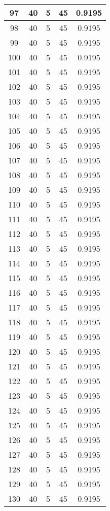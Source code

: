 \documentclass[letterpaper, 12pt]{article}
\begin{document}
\begin{longtable}{|c|c|c|c|c|}
\hline
97 & 40 & 5 & 45 & 0.9195 \\
\hline
98 & 40 & 5 & 45 & 0.9195 \\
\hline
99 & 40 & 5 & 45 & 0.9195 \\
\hline
100 & 40 & 5 & 45 & 0.9195 \\
\hline
101 & 40 & 5 & 45 & 0.9195 \\
\hline
102 & 40 & 5 & 45 & 0.9195 \\
\hline
103 & 40 & 5 & 45 & 0.9195 \\
\hline
104 & 40 & 5 & 45 & 0.9195 \\
\hline
105 & 40 & 5 & 45 & 0.9195 \\
\hline
106 & 40 & 5 & 45 & 0.9195 \\
\hline
107 & 40 & 5 & 45 & 0.9195 \\
\hline
108 & 40 & 5 & 45 & 0.9195 \\
\hline
109 & 40 & 5 & 45 & 0.9195 \\
\hline
110 & 40 & 5 & 45 & 0.9195 \\
\hline
111 & 40 & 5 & 45 & 0.9195 \\
\hline
112 & 40 & 5 & 45 & 0.9195 \\
\hline
113 & 40 & 5 & 45 & 0.9195 \\
\hline
114 & 40 & 5 & 45 & 0.9195 \\
\hline
115 & 40 & 5 & 45 & 0.9195 \\
\hline
116 & 40 & 5 & 45 & 0.9195 \\
\hline
117 & 40 & 5 & 45 & 0.9195 \\
\hline
118 & 40 & 5 & 45 & 0.9195 \\
\hline
119 & 40 & 5 & 45 & 0.9195 \\
\hline
120 & 40 & 5 & 45 & 0.9195 \\
\hline
121 & 40 & 5 & 45 & 0.9195 \\
\hline
122 & 40 & 5 & 45 & 0.9195 \\
\hline
123 & 40 & 5 & 45 & 0.9195 \\
\hline
124 & 40 & 5 & 45 & 0.9195 \\
\hline
125 & 40 & 5 & 45 & 0.9195 \\
\hline
126 & 40 & 5 & 45 & 0.9195 \\
\hline
127 & 40 & 5 & 45 & 0.9195 \\
\hline
128 & 40 & 5 & 45 & 0.9195 \\
\hline
129 & 40 & 5 & 45 & 0.9195 \\
\hline
130 & 40 & 5 & 45 & 0.9195 \\

\end{longtable}
\end{document}
